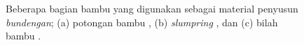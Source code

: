 \begin{figure}[b!]
    \centering
    \hspace{0.5cm}
    \hspace{0.5cm}
    \caption{Beberapa bagian bambu yang digunakan sebagai material penyusun \textit{bundengan}; (a) potongan bambu \cite{palmer}, (b) \textit{slumpring} \cite{videoBundenganTNTF}, dan (c) bilah bambu \cite{skripsiSaid}.}
    \label{fig:bagianBambu}
\end{figure}
